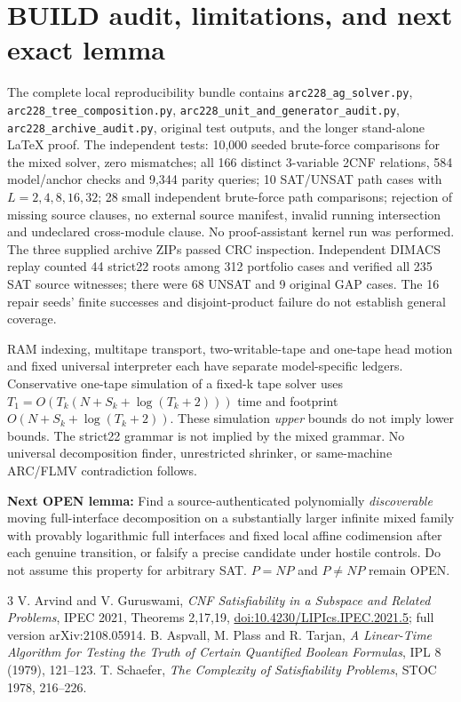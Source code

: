 \documentclass[11pt]{article}
\begin{document}
\section{BUILD audit, limitations, and next exact lemma}
The complete local reproducibility bundle contains
\texttt{arc228\_ag\_solver.py},
\texttt{arc228\_tree\_composition.py},
\texttt{arc228\_unit\_and\_generator\_audit.py},
\texttt{arc228\_archive\_audit.py}, original test outputs,
and the longer stand-alone LaTeX proof.
The independent tests: 10,000 seeded brute-force comparisons
for the mixed solver, zero mismatches; all 166 distinct 3-variable
2CNF relations, 584 model/anchor checks and 9,344 parity queries;
10 SAT/UNSAT path cases with $L=2,4,8,16,32$;
28 small independent brute-force path comparisons;
rejection of missing source clauses, no external source manifest,
invalid running intersection and undeclared cross-module clause.
No proof-assistant kernel run was performed.
The three supplied archive ZIPs passed CRC inspection.
Independent DIMACS replay counted 44 strict22 roots among 312
portfolio cases and verified all 235 SAT source witnesses;
there were 68 UNSAT and 9 original GAP cases.
The 16 repair seeds' finite successes and disjoint-product failure
do not establish general coverage.

RAM indexing, multitape transport, two-writable-tape and one-tape
head motion and fixed universal interpreter each have separate
model-specific ledgers.
Conservative one-tape simulation of a fixed-k tape solver uses
$T_1=O(T_k(N+S_k+\log(T_k+2)))$ time and footprint
$O(N+S_k+\log(T_k+2))$.
These simulation \emph{upper} bounds do not imply lower bounds.
The strict22 grammar is not implied by the mixed grammar.
No universal decomposition finder, unrestricted shrinker,
or same-machine ARC/FLMV contradiction follows.

\noindent\textbf{Next OPEN lemma:}
Find a source-authenticated polynomially \emph{discoverable}
moving full-interface decomposition on a substantially larger
infinite mixed family with provably logarithmic full interfaces
and fixed local affine codimension after each genuine transition,
or falsify a precise candidate under hostile controls.
Do not assume this property for arbitrary SAT.
$P=NP$ and $P\ne NP$ remain OPEN.

\begin{thebibliography}{3}
 V. Arvind and V. Guruswami,
\emph{CNF Satisfiability in a Subspace and Related Problems},
IPEC 2021, Theorems 2,17,19,
\href{https://doi.org/10.4230/LIPIcs.IPEC.2021.5}{doi:10.4230/LIPIcs.IPEC.2021.5};
full version arXiv:2108.05914.
 B. Aspvall, M. Plass and R. Tarjan,
\emph{A Linear-Time Algorithm for Testing the Truth of Certain
Quantified Boolean Formulas}, IPL 8 (1979), 121--123.
 T. Schaefer, \emph{The Complexity of Satisfiability Problems},
STOC 1978, 216--226.
\end{thebibliography}
\end{document}
